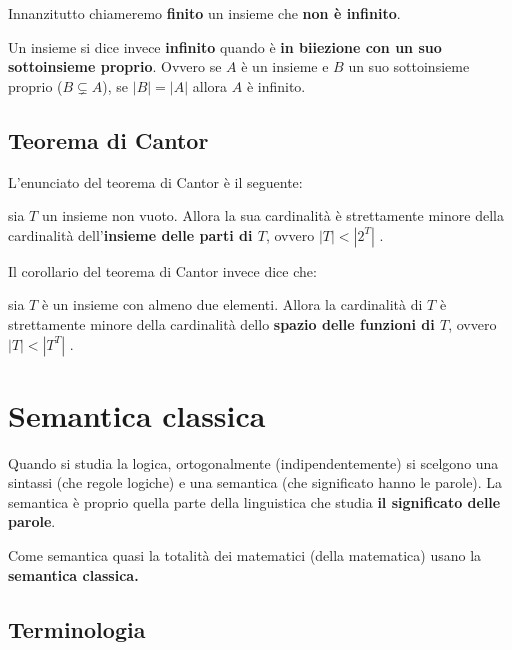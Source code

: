 \documentclass[
  a4paper,
]{article}
\begin{document}
Innanzitutto chiameremo \textbf{finito} un insieme che \textbf{non è
infinito}.

Un insieme si dice invece \textbf{infinito} quando è \textbf{in
biiezione con un suo sottoinsieme proprio}. Ovvero se \(A\) è un insieme
e \(B\) un suo sottoinsieme proprio (\(B \subsetneq A\)), se
\(|B| = |A|\) allora \(A\) è infinito.

\hypertarget{teorema-di-cantor}{%
\subsection{Teorema di Cantor}\label{teorema-di-cantor}}

L'enunciato del teorema di Cantor è il seguente:

sia \(T\) un insieme non vuoto. Allora la sua cardinalità è strettamente
minore della cardinalità dell'\textbf{insieme delle parti di \(T\)},
ovvero \(\left\lvert T \right\rvert < \left\lvert 2^T \right\rvert\) .

Il corollario del teorema di Cantor invece dice che:

sia \(T\) è un insieme con almeno due elementi. Allora la cardinalità di
\(T\) è strettamente minore della cardinalità dello \textbf{spazio delle
funzioni di \(T\)}, ovvero
\(\left\lvert T \right\rvert < \left\lvert T^T \right\rvert\) .

\newpage

\hypertarget{semantica-classica}{%
\section{Semantica classica}\label{semantica-classica}}

Quando si studia la logica, ortogonalmente (indipendentemente) si
scelgono una sintassi (che regole logiche) e una semantica (che
significato hanno le parole). La semantica è proprio quella parte della
linguistica che studia \textbf{il significato delle parole}.

Come semantica quasi la totalità dei matematici (della matematica) usano
la \textbf{semantica classica.}

\hypertarget{terminologia}{%
\subsection{Terminologia}\label{terminologia}}
\end{document}
